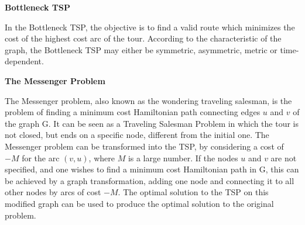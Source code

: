 \textbf{Bottleneck TSP}

In the Bottleneck TSP, the objective is to find a valid route which minimizes the cost of the highest cost arc of the tour. According to the characteristic of the graph,
the Bottleneck TSP may either be symmetric, asymmetric, metric or time-dependent.


\textbf{The Messenger Problem}

The Messenger problem, also known as the wondering traveling salesman, is the problem of finding a minimum cost Hamiltonian path connecting edges $u$ and $v$ of the graph G. It can be seen as a Traveling Salesman Problem in which the tour is not closed, but ends on a specific node, different from the initial one. The Messenger problem can be transformed into the TSP, by considering a cost of $-M$ for the arc $(v, u)$, where $M$ is a large number. If the nodes $u$ and $v$ are not specified, and one wishes to find a minimum cost Hamiltonian path in G, this can be achieved by a graph transformation, adding one node and connecting it to all other nodes by arcs of cost $-M$. The optimal solution to the TSP on this modified graph can be used to produce the optimal solution to the original problem.